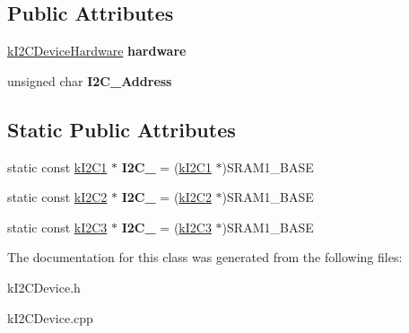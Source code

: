 \subsection*{Public Attributes}
\begin{DoxyCompactItemize}
\item 
\hyperlink{classkI2CDeviceHardware}{k\+I2\+C\+Device\+Hardware} {\bfseries hardware}\hypertarget{classkI2CDevice_a2572571c46a1ddb9dbee0882f98cf5f4}{}\label{classkI2CDevice_a2572571c46a1ddb9dbee0882f98cf5f4}

\item 
unsigned char {\bfseries I2\+C\+\_\+\+Address}\hypertarget{classkI2CDevice_a226a4250afdfc9c9607dc2efc72d97e5}{}\label{classkI2CDevice_a226a4250afdfc9c9607dc2efc72d97e5}

\end{DoxyCompactItemize}
\subsection*{Static Public Attributes}
\begin{DoxyCompactItemize}
\item 
static const \hyperlink{structkI2C1}{k\+I2\+C1} $\ast$ {\bfseries I2\+C\+\_} = (\hyperlink{structkI2C1}{k\+I2\+C1} $\ast$)S\+R\+A\+M1\+\_\+\+B\+A\+SE\hypertarget{classkI2CDevice_abf6aae166d28e3c81f503b6c96fdc6d5}{}\label{classkI2CDevice_abf6aae166d28e3c81f503b6c96fdc6d5}

\item 
static const \hyperlink{structkI2C2}{k\+I2\+C2} $\ast$ {\bfseries I2\+C\+\_} = (\hyperlink{structkI2C2}{k\+I2\+C2} $\ast$)S\+R\+A\+M1\+\_\+\+B\+A\+SE\hypertarget{classkI2CDevice_a8042ffc9d65f22469819ecfa78abe84d}{}\label{classkI2CDevice_a8042ffc9d65f22469819ecfa78abe84d}

\item 
static const \hyperlink{structkI2C3}{k\+I2\+C3} $\ast$ {\bfseries I2\+C\+\_} = (\hyperlink{structkI2C3}{k\+I2\+C3} $\ast$)S\+R\+A\+M1\+\_\+\+B\+A\+SE\hypertarget{classkI2CDevice_a0f0c6ced2cc7f36b77171c2dd0130784}{}\label{classkI2CDevice_a0f0c6ced2cc7f36b77171c2dd0130784}

\end{DoxyCompactItemize}


The documentation for this class was generated from the following files\+:\begin{DoxyCompactItemize}
\item 
k\+I2\+C\+Device.\+h\item 
k\+I2\+C\+Device.\+cpp\end{DoxyCompactItemize}

